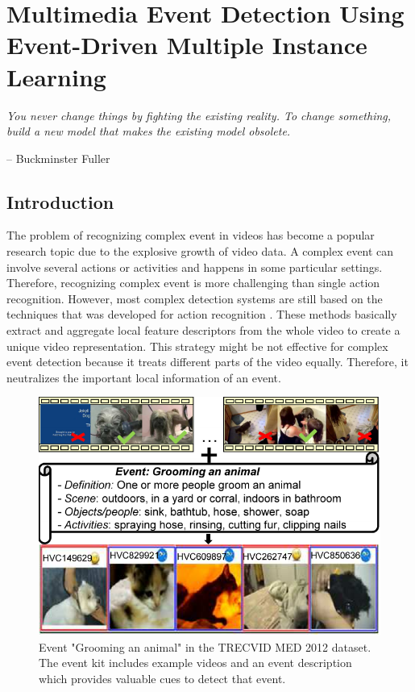 \chapter{Multimedia Event Detection Using Event-Driven Multiple Instance Learning}
\label{chapter5}
\epigraph{\textit{You never change things by fighting the existing reality.
		To change something, build a new model that makes the existing model obsolete.}}{ -- Buckminster Fuller}

\ifpdf
    \graphicspath{{Chapter5/Figs/Raster/}{Chapter5/Figs/PDF/}{Chapter5/Figs/}}
\else
    \graphicspath{{Chapter5/Figs/Vector/}{Chapter5/Figs/}}
\fi


\section{Introduction}
The problem of recognizing complex event in videos has become a popular research topic due to the explosive growth of video data. A complex event can involve several actions or activities and happens in some particular settings. Therefore, recognizing complex event is more challenging than single action recognition. However, most complex detection systems are still based on the techniques that was developed for action recognition \cite{oneata2013action,Wang2013}. These methods basically extract and aggregate local feature descriptors from the whole video to create a unique video representation. This strategy might be not effective for complex event detection because it treats different parts of the video equally. Therefore, it neutralizes the important local information of an event.

\begin{figure}
	\centering
	\includegraphics[width=1\textwidth]{figure_1.pdf}
	\caption{Event "Grooming an animal" in the TRECVID MED 2012 dataset. The event kit includes example videos and an event description which provides valuable cues to detect that event.}
	\label{figure_1}
\end{figure}


